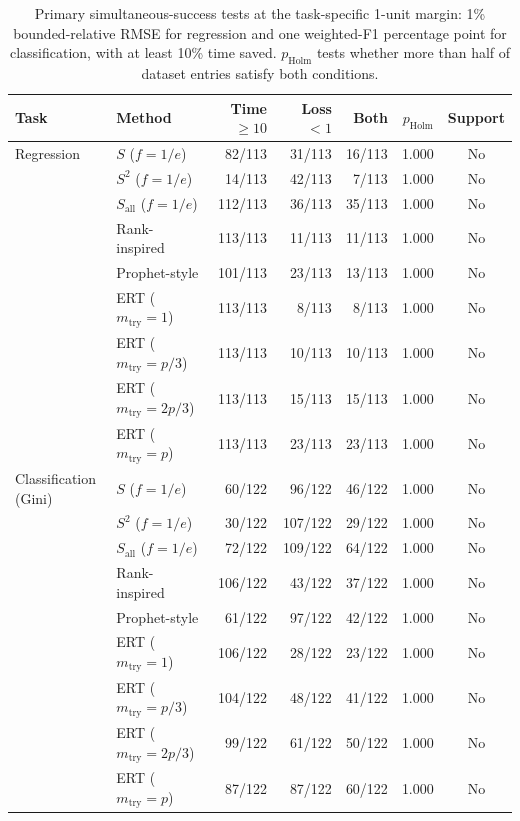 \begin{table}[t]
\centering
\caption{Primary simultaneous-success tests at the task-specific 1-unit margin: 1\% bounded-relative RMSE for regression and one weighted-F1 percentage point for classification, with at least 10\% time saved. $p_{\mathrm{Holm}}$ tests whether more than half of dataset entries satisfy both conditions.}
\label{tab:inference-joint-primary}
\scriptsize
\setlength{\tabcolsep}{4pt}
\begin{tabular}{@{}llrrrrc@{}}
\toprule
Task & Method & Time $\geq10$ & Loss $<1$ & Both & $p_{\mathrm{Holm}}$ & Support \\
\midrule
Regression & $S$ ($f=1/e$) & 82/113 & 31/113 & 16/113 & 1.000 & No \\
 & $S^{2}$ ($f=1/e$) & 14/113 & 42/113 & 7/113 & 1.000 & No \\
 & $S_{\mathrm{all}}$ ($f=1/e$) & 112/113 & 36/113 & 35/113 & 1.000 & No \\
 & Rank-inspired & 113/113 & 11/113 & 11/113 & 1.000 & No \\
 & Prophet-style & 101/113 & 23/113 & 13/113 & 1.000 & No \\
 & ERT ($m_{\mathrm{try}}=1$) & 113/113 & 8/113 & 8/113 & 1.000 & No \\
 & ERT ($m_{\mathrm{try}}=p/3$) & 113/113 & 10/113 & 10/113 & 1.000 & No \\
 & ERT ($m_{\mathrm{try}}=2p/3$) & 113/113 & 15/113 & 15/113 & 1.000 & No \\
 & ERT ($m_{\mathrm{try}}=p$) & 113/113 & 23/113 & 23/113 & 1.000 & No \\
\addlinespace
Classification (Gini) & $S$ ($f=1/e$) & 60/122 & 96/122 & 46/122 & 1.000 & No \\
 & $S^{2}$ ($f=1/e$) & 30/122 & 107/122 & 29/122 & 1.000 & No \\
 & $S_{\mathrm{all}}$ ($f=1/e$) & 72/122 & 109/122 & 64/122 & 1.000 & No \\
 & Rank-inspired & 106/122 & 43/122 & 37/122 & 1.000 & No \\
 & Prophet-style & 61/122 & 97/122 & 42/122 & 1.000 & No \\
 & ERT ($m_{\mathrm{try}}=1$) & 106/122 & 28/122 & 23/122 & 1.000 & No \\
 & ERT ($m_{\mathrm{try}}=p/3$) & 104/122 & 48/122 & 41/122 & 1.000 & No \\
 & ERT ($m_{\mathrm{try}}=2p/3$) & 99/122 & 61/122 & 50/122 & 1.000 & No \\
 & ERT ($m_{\mathrm{try}}=p$) & 87/122 & 87/122 & 60/122 & 1.000 & No \\

\end{tabular}
\end{table}
